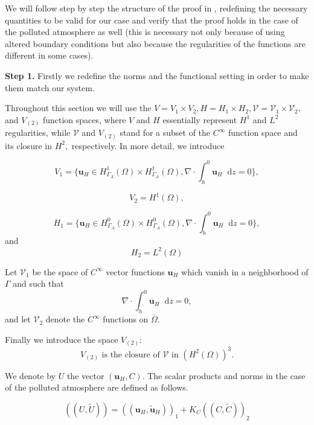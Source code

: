 \documentclass[11pt]{article}
\newcommand*\diff{\mathop{}\!\mathrm{d}}
\begin{document}
We will follow step by step the structure of the proof in \cite{temam2005some}, redefining the necessary quantities to be valid for our case and verify that the proof holds in the case of the polluted atmosphere as well (this is necessary not only because of using altered boundary conditions but also because the regularities of the functions are different in some cases).

\textbf{Step 1.} Firstly we redefine the norms and the functional setting in order to make them match our system.

Throughout this section we will use the $V = V_1 \times V_2, H = H_1 \times H_2, \mathcal{V} = \mathcal{V}_1 \times \mathcal{V}_2,$ and $V_{(2)}$ function spaces, where $V$ and $H$ essentially represent $H^1$ and $L^2$ regularities, while $\mathcal{V}$ and $V_{(2)}$ stand for a subset of the $C^{\infty}$ function space and its closure in $H^2,$ respectively. In more detail, we introduce

$$ V_1 = \{ \mathbf{u}_H \in H^1_{\Gamma_A} (\Omega) \times H^1_{\Gamma_A} (\Omega), \nabla \cdot \int_h^0 \mathbf{u}_H \diff z = 0 \}, $$

$$ V_2 = H^1(\Omega), $$

$$ H_1 = \{ \mathbf{u}_H \in H^0_{\Gamma_A} (\Omega) \times H^0_{\Gamma_A} (\Omega), \nabla \cdot \int_h^0 \mathbf{u}_H \diff z = 0 \}, $$
%
and
%
$$ H_2 = L^2(\Omega) $$

Let $\mathcal{V}_1$ be the space of $C^\infty$ vector functions $\mathbf{u}_H$ which vanish in a neighborhood of $\Gamma$ and such that $$\nabla \cdot \int_h^0 \mathbf{u}_H \diff z = 0,$$ and let $\mathcal{V}_2$ denote the $C^\infty$ functions on $\bar{\Omega}$.

Finally we introduce the space $V_{(2)}:$
$$ V_{(2)} \text{ is the closure of } \mathcal{V} \text{ in } (H^2(\Omega))^3.$$

We denote by $U$ the vector $(\mathbf{u}_H, C).$ The scalar products and norms in the case of the polluted atmosphere are defined as follows.

\[ ((U, \tilde{U})) = ((\mathbf{u}_H, \mathbf{\tilde{u}}_H))_1 + K_C ((C, \tilde{C}))_2 \]
\end{document}
